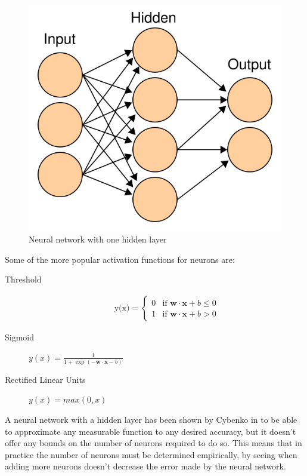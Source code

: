 \begin{figure}[h]
\begin{center}
\includegraphics[width=0.7\columnwidth]{img/artificial_neural_network.png}
\caption{
\label{fig:neural_network}
Neural network with one hidden layer \cite{neural_network}
}
\end{center}
\end{figure}

Some of the more popular activation functions for neurons are:

\begin{description}
\item[Threshold] \begin{eqnarray}
  \mbox{y(x)} = \left\{ 
    \begin{array}{ll} 
      0 & \mbox{if } \mathbf{w}\cdot \mathbf{x} + b \leq 0 \\
      1 & \mbox{if } \mathbf{w}\cdot \mathbf{x} + b > 0
    \end{array}
  \right.
\end{eqnarray} \cite{rosenblatt1958perceptron}
\item[Sigmoid] $ y(x) = \frac{1}{1+\exp(-\mathbf{w} \cdot \mathbf{x} -b)} $ \cite{cybenko1989approximation}
\item[Rectified Linear Units] $ y(x) = max(0, x) $ \cite{nair2010rectified}
\end{description}

A neural network with a hidden layer has been shown by Cybenko in \cite{cybenko1989approximation} to be able to approximate any measurable function to any desired accuracy, but it doesn't offer any bounds on the number of neurons required to do so. This means that in practice the number of neurons must be determined empirically, by seeing when adding more neurons doesn't decrease the error made by the neural network. 

